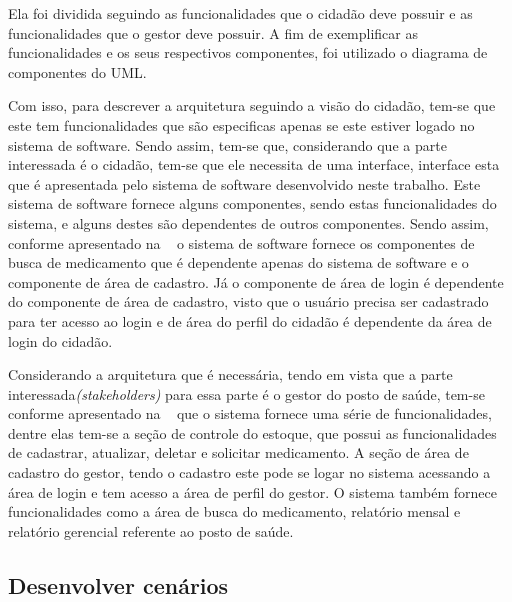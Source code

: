 %

Ela foi dividida seguindo as funcionalidades que o cidadão deve possuir e as funcionalidades que o gestor deve possuir. A fim de exemplificar as funcionalidades e os seus respectivos componentes, foi utilizado o diagrama de componentes do \acrfull{UML}.

Com isso, para descrever a arquitetura seguindo a visão do cidadão, tem-se que este tem funcionalidades que são especificas apenas se este estiver logado no sistema de software. Sendo assim, tem-se que, considerando que a parte interessada é o cidadão, tem-se que ele necessita de uma interface, interface esta que é apresentada pelo sistema de software desenvolvido neste trabalho. Este sistema de software fornece alguns componentes, sendo estas funcionalidades do sistema, e alguns destes são dependentes de outros componentes. Sendo assim, conforme apresentado na ~ o sistema de software fornece os componentes de busca de medicamento que é dependente apenas do sistema de software e o componente de área de cadastro. Já o componente de área de login é dependente do componente de área de cadastro, visto que o usuário precisa ser cadastrado para ter acesso ao login e de área do perfil do cidadão é dependente da área de login do cidadão.


%

Considerando a arquitetura que é necessária, tendo em vista que a parte interessada\emph{(stakeholders)} para essa parte é o gestor do posto de saúde, tem-se conforme apresentado na ~ que o sistema fornece uma série de funcionalidades, dentre elas tem-se a seção de controle do estoque, que possui as funcionalidades de cadastrar, atualizar, deletar e solicitar medicamento. A seção de área de cadastro do gestor, tendo o cadastro este pode se logar no sistema acessando a área de login e tem acesso a área de perfil do gestor. O sistema também fornece funcionalidades como a área de busca do medicamento, relatório mensal e relatório gerencial referente ao posto de saúde.

\subsection{Desenvolver cenários}

